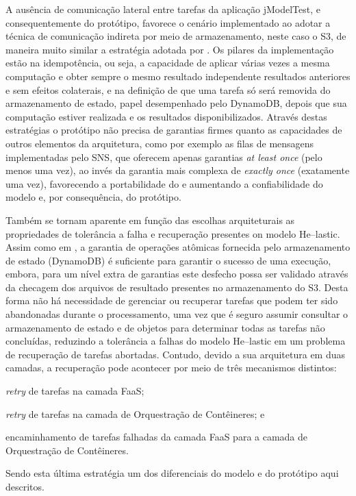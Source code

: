 \documentclass[english,brazilian]{UNISINOSmonografia} %
\begin{document}
A ausência de comunicação lateral entre tarefas da aplicação jModelTest, e consequentemente do protótipo, favorece o cenário implementado ao adotar a técnica de comunicação indireta por meio de armazenamento, neste caso o S3, de maneira muito similar a estratégia adotada por .
%
Os pilares da implementação estão na idempotência, ou seja, a capacidade de aplicar várias vezes a mesma computação e obter sempre o mesmo resultado independente resultados anteriores e sem efeitos colaterais, 
e na definição de que uma tarefa só será removida do armazenamento de estado, papel desempenhado pelo DynamoDB, depois que sua computação estiver realizada e os resultados disponibilizados.
%
Através destas estratégias o protótipo não precisa de garantias firmes quanto as capacidades de outros elementos da arquitetura, como por exemplo as filas de mensagens implementadas pelo SNS, que oferecem apenas garantias \textit{at least once} (pelo menos uma vez), ao invés da garantia mais complexa de \textit{exactly once} (exatamente uma vez), favorecendo a portabilidade do e aumentando a confiabilidade do modelo e, por consequência, do protótipo.



Também se tornam aparente em função das escolhas arquiteturais as propriedades de tolerância a falha e recuperação presentes on modelo \textsf{He}--lastic.
%
Assim como em , a garantia de operações atômicas fornecida pelo armazenamento de estado (DynamoDB) é suficiente para garantir o sucesso de uma execução, embora, para um nível extra de garantias este desfecho possa ser validado através da checagem dos arquivos de resultado presentes no armazenamento do S3.
%
Desta forma não há necessidade de gerenciar ou recuperar tarefas que podem ter sido abandonadas durante o processamento, uma vez que é seguro assumir consultar o armazenamento de estado e de objetos para determinar todas as tarefas não concluídas, reduzindo a tolerância a falhas do modelo \textsf{He}--lastic em um problema de recuperação de tarefas abortadas.
%
Contudo, devido a sua arquitetura em duas camadas, a recuperação pode acontecer por meio de três mecanismos distintos: 
\begin{inparaenum} 
	\item \textit{retry} de tarefas na camada FaaS;
	\item \textit{retry} de tarefas na camada de Orquestração de Contêineres; e
	\item encaminhamento de tarefas falhadas da camada FaaS para a camada de Orquestração de Contêineres.
\end{inparaenum}
Sendo esta última estratégia um dos diferenciais do modelo e do protótipo aqui descritos.
\end{document}
